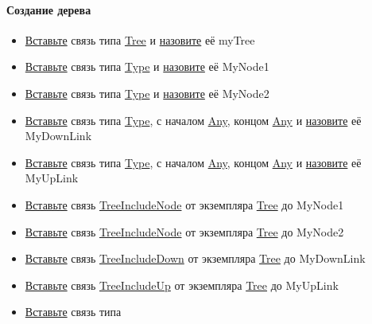 \documentclass{article}
\begin{document}
\paragraph{Создание дерева}
\begin{itemize}
  \item \hyperlink{DeepCase.InsertLink.Description}{Вставьте} связь типа
        \hyperlink{Tree}{Tree} и \hyperlink{FAQ.HowToSetName}{назовите} её
        myTree
  \item \hyperlink{DeepCase.InsertLink.Description}{Вставьте} связь типа
        \hyperlink{Type.Description}{Type} и
        \hyperlink{FAQ.HowToSetName}{назовите} её MyNode1
  \item \hyperlink{DeepCase.InsertLink.Description}{Вставьте} связь типа
        \hyperlink{Type.Description}{Type} и
        \hyperlink{FAQ.HowToSetName}{назовите} её MyNode2
  \item \hyperlink{DeepCase.InsertLink.Description}{Вставьте} связь типа
        \hyperlink{Type.Description}{Type}, с началом
        \hyperlink{Core.Any.Description}{Any}, концом
        \hyperlink{Core.Any.Description}{Any} и
        \hyperlink{FAQ.HowToSetName}{назовите} её
        MyDownLink
  \item \hyperlink{DeepCase.InsertLink.Description}{Вставьте} связь типа
        \hyperlink{Type.Description}{Type}, с началом
        \hyperlink{Core.Any.Description}{Any}, концом
        \hyperlink{Core.Any.Description}{Any} и
        \hyperlink{FAQ.HowToSetName}{назовите} её
        MyUpLink
  \item \hyperlink{DeepCase.InsertLink.Description}{Вставьте} связь
        \hyperlink{Core.TreeIncludeNode.Description}{TreeIncludeNode} от
        экземпляра \hyperlink{Core.Tree.Description}{Tree} до MyNode1
  \item \hyperlink{DeepCase.InsertLink.Description}{Вставьте} связь
        \hyperlink{Core.TreeIncludeNode.Description}{TreeIncludeNode} от
        экземпляра \hyperlink{Core.Tree.Description}{Tree} до MyNode2
  \item \hyperlink{DeepCase.InsertLink.Description}{Вставьте} связь
        \hyperlink{Core.TreeIncludeDown.Description}{TreeIncludeDown} от
        экземпляра \hyperlink{Core.Tree.Description}{Tree} до MyDownLink
  \item \hyperlink{DeepCase.InsertLink.Description}{Вставьте} связь
        \hyperlink{Core.TreeIncludeNode.Description}{TreeIncludeUp} от
        экземпляра \hyperlink{Core.Tree.Description}{Tree} до MyUpLink
  \item \hyperlink{DeepCase.InsertLink.Description}{Вставьте} связь типа

\end{itemize}
\end{document}
